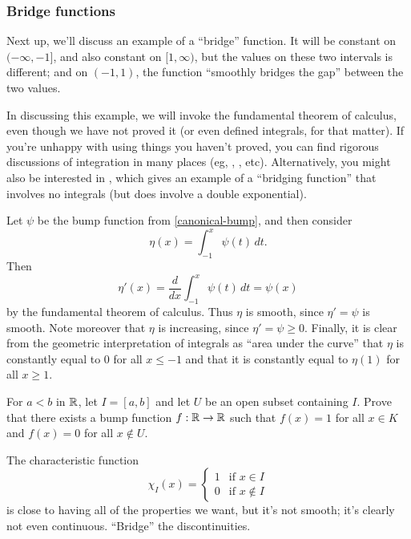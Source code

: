 \subsubsection*{Bridge functions}

Next up, we'll discuss an example of a ``bridge'' function. It will be constant on $(-\infty, -1]$, and also constant on $[1, \infty)$, but the values on these two intervals is different; and on $(-1,1)$, the function ``smoothly bridges the gap'' between the two values. 

In discussing this example, we will invoke the fundamental theorem of calculus, even though we have not proved it (or even defined integrals, for that matter). If you're unhappy with using things you haven't proved, you can find rigorous discussions of integration in many places (eg, \cite[chapter 5]{protter-morrey}, \cite[chapter 6]{rudin}, etc). Alternatively, you might also be interested in \cite[chapter 3, example 12]{counterexamples}, which gives an example of a ``bridging function'' that involves no integrals (but does involve a double exponential). 

\begin{example} \label{bridge-function}
	Let $\psi$ be the bump function from \cref{canonical-bump}, and then consider 
	\[ \eta(x) = \int_{-1}^x \psi(t)\, dt. \]
	Then 
	\[ \eta'(x) = \frac{d}{dx} \int_{-1}^x \psi(t)\, dt = \psi(x) \]
	by the fundamental theorem of calculus. Thus $\eta$ is smooth, since $\eta' = \psi$ is smooth. Note moreover that $\eta$ is increasing, since $\eta' = \psi \geq 0$. Finally, it is clear from the geometric interpretation of integrals as ``area under the curve'' that $\eta$ is constantly equal to 0 for all $x \leq -1$ and that it is constantly equal to $\eta(1)$ for all $x \geq 1$. 
\end{example}

\begin{exercise} \label{constant-compact-zero-outside-neighborhood}
	For $a < b$ in $\mathbb{R}$, let $I = [a, b]$ and let $U$ be an open subset containing $I$. Prove that there exists a bump function $f : \mathbb{R} \to \mathbb{R}$ such that $f(x) = 1$ for all $x \in K$ and $f(x) = 0$ for all $x \notin U$. \begin{hint} 
	The characteristic function \[ \chi_I(x) = \begin{cases} 1 & \text{if } x \in I \\ 0 & \text{if } x \notin I \end{cases} \]
	is close to having all of the properties we want, but it's not smooth; it's clearly not even continuous. ``Bridge'' the discontinuities. \end{hint}
\end{exercise}

